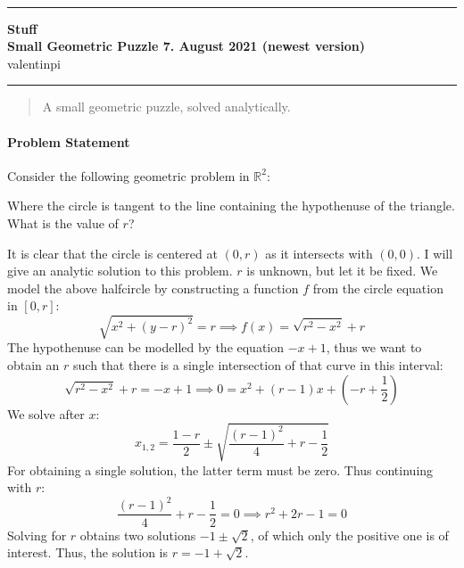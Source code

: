 \documentclass[10pt]{article}
\theoremstyle{definition}
\theoremstyle{remark}
\newcommand{\Authors}{valentinpi}
\begin{document}
\vspace*{-12ex}
\phantom{}\\
\noindent\rule{\textwidth}{0.1pt}
\large \textbf{Stuff} \vspace*{0.25cm}\\
\normalsize \textbf{Small Geometric Puzzle \hfill 7. August 2021 { (newest version)}}\\
\Authors\\
\noindent\rule{\textwidth}{0.1pt}

\begin{abstract}
    \noindent A small geometric puzzle, solved analytically.
\end{abstract}

\vspace{\baselineskip}

\paragraph{Problem Statement} Consider the following geometric problem in \(\mathbb{R}^2\):

\begin{minipage}{\linewidth}
    \centering
    \vspace{0.25cm}
    \vspace{0.25cm}
\end{minipage}

Where the circle is tangent to the line containing the hypothenuse of the triangle. What is the value of \(r\)?

It is clear that the circle is centered at \((0, r)\) as it intersects with \((0, 0)\). I will give an analytic solution to this problem. \(r\) is unknown, but let it be fixed. We model the above halfcircle by constructing a function \(f\) from the circle equation in \([0, r]\):
\[
    \sqrt{x^2+(y-r)^2} = r \implies f(x) = \sqrt{r^2-x^2}+r
\]
The hypothenuse can be modelled by the equation \(-x+1\), thus we want to obtain an \(r\) such that there is a single intersection of that curve in this interval:
\[
    \sqrt{r^2-x^2}+r = -x + 1 \implies 0 = x^2 + (r-1)x + \left(-r+\frac{1}{2}\right)
\]
We solve after \(x\):
\[
    x_{1,2} = \frac{1-r}{2} \pm \sqrt{\frac{(r-1)^2}{4}+r-\frac{1}{2}}
\]
For obtaining a single solution, the latter term must be zero. Thus continuing with \(r\):
\[
    \frac{(r-1)^2}{4}+r-\frac{1}{2} = 0 \implies r^2+2r-1=0
\]
Solving for \(r\) obtains two solutions \(-1 \pm \sqrt{2}\), of which only the positive one is of interest. Thus, the solution is \(r = -1 + \sqrt{2}\).
\end{document}
